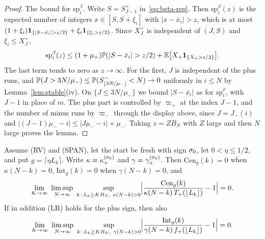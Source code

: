 \begin{proof}
The bound for $\mathrm{sp}^\beta_i$. Write $S=S^\plus_{J-1}$ in~\eqref{eq:beta-rep}.
Then $\mathrm{sp}^\beta_i(z)$ is the expected number of integers $x\in[S,S+\xi_i]$ with
$|x-\bar x_i|>z$, which is at most
$(1+\xi_i)\ones_{\{|S-\bar x_i|>z/2\}}+\xi_i\ones_{\{\xi_i>z/2\}}$. Since $X^\plus_J$ is
independent of $(J,S)$ and $\xi_i\le X^\plus_J$,
\[
 \mathrm{sp}^\beta_i(z)\le(1+\mu_\plus)\Prob(|S-\bar x_i|>z/2)+\E\bigl[X_\plus\ones_{\{X_\plus>z/2\}}\bigr].
\]
The last term tends to zero as $z\to\infty$. For the first, $J$ is independent of the
plus runs, and
$\mathbb{P}(J>3N/\mu_{-})\le\mathbb{P}(S^{-}_{\lfloor3N/\mu_{-}\rfloor}<N)\to0$ uniformly
in $i\le N$ by Lemma~\ref{lem:stable}(iv). On $\{J\le3N/\mu_\minus\}$ we bound
$|S-\bar x_i|$ as for $\mathrm{sp}^\rho_i$, with $J-1$ in place of $m$. The plus part
is controlled by $\varpi_\plus$ at the index $J-1$, and the number of minus runs by
$\varpi_\minus$ through the display above, since $J=J_\minus(i)$ and
$|(J-1)\mu_\minus-i|\le|J\mu_\minus-i|+\mu_\minus$. Taking $z=ZB_N$ with $Z$
large and then $N$ large proves the lemma.
\end{proof}

\begin{lemma}\label{lem:one-giant}
Assume (RV) and (SPAN), let the start be fresh with sign $\sigma_0$, let
$0<\eta\le1/2$, and put $g=\lceil\eta L_k\rceil$. Write $\kappa=\kappa^{(\sigma_0)}_{+}$
and $\gamma=\gamma^{(\sigma_0)}_{+}$. Then $\mathrm{Cen}_g(k)=0$ when $\kappa(N-k)=0$,
$\mathrm{Int}_g(k)=0$ when $\gamma(N-k)=0$, and
\[
 \lim_{K\to\infty}\ \limsup_{N\to\infty}\ \sup_{k\,:\,L_k\ge KB_N,\ \kappa(N-k)>0}
 \Bigl|\frac{\mathrm{Cen}_g(k)}{\kappa(N-k)\,T_\plus(\lfloor L_k\rfloor)}-1\Bigr|=0 .
\]
If in addition (LR) holds for the plus sign, then also
\[
 \lim_{K\to\infty}\ \limsup_{N\to\infty}\ \sup_{k\,:\,L_k\ge KB_N,\ \gamma(N-k)>0}
 \Bigl|\frac{\mathrm{Int}_g(k)}{\gamma(N-k)\,f_\plus(\lfloor L_k\rfloor)}-1\Bigr|=0 .
\]
\end{lemma}


